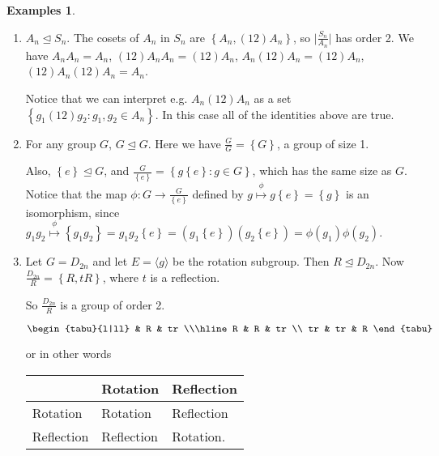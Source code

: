 \documentclass{article}
\theoremstyle{definition}
\newtheorem*{exmps}{Examples}
\newcommand{\gene}[1]{\langle #1 \rangle}
\begin{document}
\begin{exmps}\hfill
  \begin{enumerate}
    \item $A_n \trianglelefteq S_n$. The cosets of $A_n$ in $S_n$ are $\left\{ A_n , (12)A_n\right\}$, so
      $\big|\frac{S_n}{A_n}\big|$ has order 2. We have
      $A_nA_n = A_n$, $(12)A_nA_n=(12)A_n$, $A_n(12)A_n=(12)A_n$, $(12)A_n(12)A_n=A_n$.

      Notice that we can interpret e.g. $A_n(12)A_n$ as a set $\left\{ g_1(12)g_2 : g_1,g_2 \in A_n \right\}$. In this case all of the identities above are true.

    \item For any group $G$, $G \trianglelefteq G$. Here we have $\frac{G}{G}=\left\{ G \right\}$, a group of size 1.

      Also, $\left\{ e \right\} \trianglelefteq G$, and $\frac{G}{\left\{ e \right\}}=\left\{ g\left\{ e \right\}:g \in G \right\}$, which has the same size as $G$. Notice that the map $\phi : G \rightarrow \frac{G}{\left\{ e \right\}}$ defined by $g \overset{\phi}{\mapsto} g\left\{ e \right\}=\left\{ g \right\}$ is an isomorphism, since $g_1g_2 \overset{\phi}{\mapsto} \left\{ g_1g_2 \right\}=g_1g_2\left\{ e \right\}=(g_1\left\{ e \right\})(g_2\left\{ e \right\})=\phi(g_1)\phi(g_2)$. 


\newpage
    \item Let $G=D_{2n}$ and let $E = \gene{g}$ be the rotation subgroup. Then $R \trianglelefteq D_{2n}$. Now $\frac{D_{2n}}{R}=\left\{ R,tR \right\}$, where $t$ is a reflection.

      So $\frac{D_{2n}}{R}$ is a group of order 2.

      \begin{table}[h]
        \centering
        $\begin{tabu}{l|ll}
          & R & tr \\\hline
        R & R & tr \\
        tr & tr & R
        \end{tabu}$
        \label{tab:d2ntable}
      \end{table}
      or in other words

      \begin{table}[h]
        \centering
        \begin{tabular}{l|ll}
          & Rotation & Reflection\\\hline
          Rotation & Rotation & Reflection\\
          Reflection & Reflection & Rotation.
        \end{tabular}
        \label{tab:rottable}
      \end{table}
  \end{enumerate}

\end{exmps}
\end{document}
